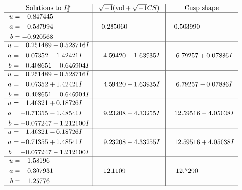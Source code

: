 \documentclass[1p]{elsarticle_modified}
\theoremstyle{definition}
\newcommand{\I}{\sqrt{-1}}
\begin{document}
$$\begin{array}{c|c|c}  
\text{Solutions to }I^u_{3}& \I (\text{vol} + \sqrt{-1}CS) & \text{Cusp shape}\\
 \hline 
\begin{aligned}
u &= -0.847445\phantom{ +0.000000I} \\
a &= \phantom{-}0.587994\phantom{ +0.000000I} \\
b &= -0.920568\phantom{ +0.000000I}\end{aligned}
 & -0.285060\phantom{ +0.000000I} & -0.503990\phantom{ +0.000000I} \\ \hline\begin{aligned}
u &= \phantom{-}0.251489 + 0.528716 I \\
a &= \phantom{-}0.07352 - 1.42421 I \\
b &= \phantom{-}0.408651 - 0.646904 I\end{aligned}
 & \phantom{-}4.59420 - 1.63935 I & \phantom{-}6.79257 + 0.07886 I \\ \hline\begin{aligned}
u &= \phantom{-}0.251489 - 0.528716 I \\
a &= \phantom{-}0.07352 + 1.42421 I \\
b &= \phantom{-}0.408651 + 0.646904 I\end{aligned}
 & \phantom{-}4.59420 + 1.63935 I & \phantom{-}6.79257 - 0.07886 I \\ \hline\begin{aligned}
u &= \phantom{-}1.46321 + 0.18726 I \\
a &= -0.71355 - 1.48541 I \\
b &= -0.077247 + 1.212100 I\end{aligned}
 & \phantom{-}9.23208 + 4.33255 I & \phantom{-}12.59516 - 4.05038 I \\ \hline\begin{aligned}
u &= \phantom{-}1.46321 - 0.18726 I \\
a &= -0.71355 + 1.48541 I \\
b &= -0.077247 - 1.212100 I\end{aligned}
 & \phantom{-}9.23208 - 4.33255 I & \phantom{-}12.59516 + 4.05038 I \\ \hline\begin{aligned}
u &= -1.58196\phantom{ +0.000000I} \\
a &= -0.307931\phantom{ +0.000000I} \\
b &= \phantom{-}1.25776\phantom{ +0.000000I}\end{aligned}
 & \phantom{-}12.1109\phantom{ +0.000000I} & \phantom{-}12.7290\phantom{ +0.000000I}\\
 \hline 
 \end{array}$$\newpage
\end{document}
